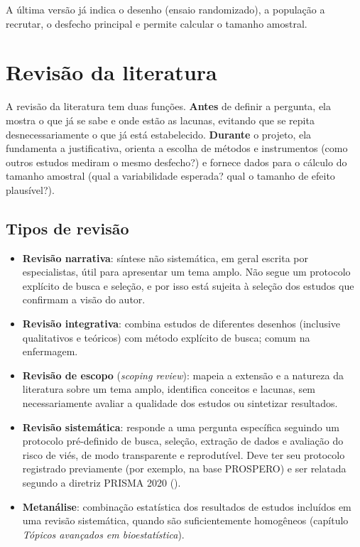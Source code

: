 \documentclass[
]{book}
\providecommand{\tightlist}{%
  \setlength{\itemsep}{0pt}\setlength{\parskip}{0pt}}
\begin{document}
A última versão já indica o desenho (ensaio randomizado), a população a recrutar, o desfecho principal e permite calcular o tamanho amostral.

\section{Revisão da literatura}\label{revisuxe3o-da-literatura}

A revisão da literatura tem duas funções. \textbf{Antes} de definir a pergunta, ela mostra o que já se sabe e onde estão as lacunas, evitando que se repita desnecessariamente o que já está estabelecido. \textbf{Durante} o projeto, ela fundamenta a justificativa, orienta a escolha de métodos e instrumentos (como outros estudos mediram o mesmo desfecho?) e fornece dados para o cálculo do tamanho amostral (qual a variabilidade esperada? qual o tamanho de efeito plausível?).

\subsection{Tipos de revisão}\label{tipos-de-revisuxe3o}

\begin{itemize}
\tightlist
\item
  \textbf{Revisão narrativa}: síntese não sistemática, em geral escrita por especialistas, útil para apresentar um tema amplo. Não segue um protocolo explícito de busca e seleção, e por isso está sujeita à seleção dos estudos que confirmam a visão do autor.
\item
  \textbf{Revisão integrativa}: combina estudos de diferentes desenhos (inclusive qualitativos e teóricos) com método explícito de busca; comum na enfermagem.
\item
  \textbf{Revisão de escopo} (\emph{scoping review}): mapeia a extensão e a natureza da literatura sobre um tema amplo, identifica conceitos e lacunas, sem necessariamente avaliar a qualidade dos estudos ou sintetizar resultados.
\item
  \textbf{Revisão sistemática}: responde a uma pergunta específica seguindo um protocolo pré-definido de busca, seleção, extração de dados e avaliação do risco de viés, de modo transparente e reprodutível. Deve ter seu protocolo registrado previamente (por exemplo, na base PROSPERO) e ser relatada segundo a diretriz PRISMA 2020 ().
\item
  \textbf{Metanálise}: combinação estatística dos resultados de estudos incluídos em uma revisão sistemática, quando são suficientemente homogêneos (capítulo \emph{Tópicos avançados em bioestatística}).
\end{itemize}
\end{document}
